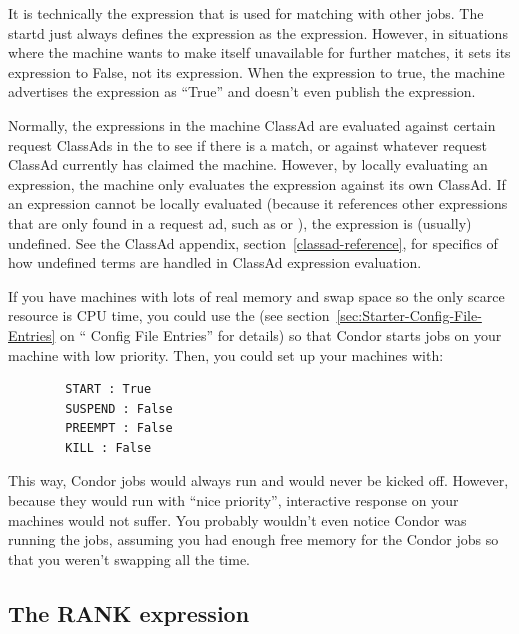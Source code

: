 It is technically the  expression that is used for
matching with other jobs.  The startd just always defines the
 expression as the  expression.
However, in situations where the machine wants to make itself
unavailable for further matches, it sets its 
expression to False, not its  expression.  When the
 expression  to true, the machine
advertises the  expression as ``True'' and doesn't
even publish the  expression.

Normally, the expressions in the machine ClassAd are evaluated against
certain request ClassAds in the  to see if there is
a match, or against whatever request ClassAd currently has claimed the
machine.  However, by locally evaluating an expression, the machine only
evaluates the expression against its own ClassAd.  If an expression
cannot be locally evaluated (because it references other expressions
that are only found in a request ad, such as  or
), the expression is (usually) undefined.  See the
ClassAd appendix, section~\ref{classad-reference}, for specifics of
how undefined terms are handled in ClassAd expression evaluation. 

\Note If you have machines with lots of real memory and swap space so
  the only scarce resource is CPU time, you could use the
   (see
  section~\ref{sec:Starter-Config-File-Entries} on ``
  Config File Entries'' for details) so that Condor starts jobs on
  your machine with low priority.  Then, you could set
  up your machines with:
\begin{verbatim}
        START : True
        SUSPEND : False
        PREEMPT : False
        KILL : False
\end{verbatim}
This way, Condor jobs would always run and would never be kicked off.
However, because they would run with ``nice priority'', interactive
response on your machines would not suffer.
You probably wouldn't even notice Condor was running the jobs,
assuming you had enough free memory for the Condor jobs so that you
weren't swapping all the time.

\subsection{The RANK expression}
\label{sec:Rank-Expression}

